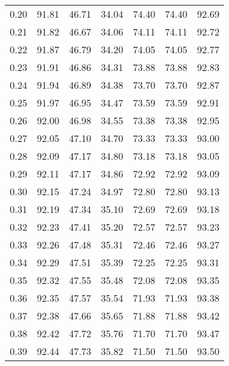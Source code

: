 \begin{tabular}{|c|c|c|c|c|c|c|}
      0.20 &     91.81 &     46.71 &      34.04 &   74.40 &      74.40 &         92.69 \\
      0.21 &     91.82 &     46.67 &      34.06 &   74.11 &      74.11 &         92.72 \\
      0.22 &     91.87 &     46.79 &      34.20 &   74.05 &      74.05 &         92.77 \\
      0.23 &     91.91 &     46.86 &      34.31 &   73.88 &      73.88 &         92.83 \\
      0.24 &     91.94 &     46.89 &      34.38 &   73.70 &      73.70 &         92.87 \\
      0.25 &     91.97 &     46.95 &      34.47 &   73.59 &      73.59 &         92.91 \\
      0.26 &     92.00 &     46.98 &      34.55 &   73.38 &      73.38 &         92.95 \\
      0.27 &     92.05 &     47.10 &      34.70 &   73.33 &      73.33 &         93.00 \\
      0.28 &     92.09 &     47.17 &      34.80 &   73.18 &      73.18 &         93.05 \\
      0.29 &     92.11 &     47.17 &      34.86 &   72.92 &      72.92 &         93.09 \\
      0.30 &     92.15 &     47.24 &      34.97 &   72.80 &      72.80 &         93.13 \\
      0.31 &     92.19 &     47.34 &      35.10 &   72.69 &      72.69 &         93.18 \\
      0.32 &     92.23 &     47.41 &      35.20 &   72.57 &      72.57 &         93.23 \\
      0.33 &     92.26 &     47.48 &      35.31 &   72.46 &      72.46 &         93.27 \\
      0.34 &     92.29 &     47.51 &      35.39 &   72.25 &      72.25 &         93.31 \\
      0.35 &     92.32 &     47.55 &      35.48 &   72.08 &      72.08 &         93.35 \\
      0.36 &     92.35 &     47.57 &      35.54 &   71.93 &      71.93 &         93.38 \\
      0.37 &     92.38 &     47.66 &      35.65 &   71.88 &      71.88 &         93.42 \\
      0.38 &     92.42 &     47.72 &      35.76 &   71.70 &      71.70 &         93.47 \\
      0.39 &     92.44 &     47.73 &      35.82 &   71.50 &      71.50 &         93.50 \\

\end{tabular}
